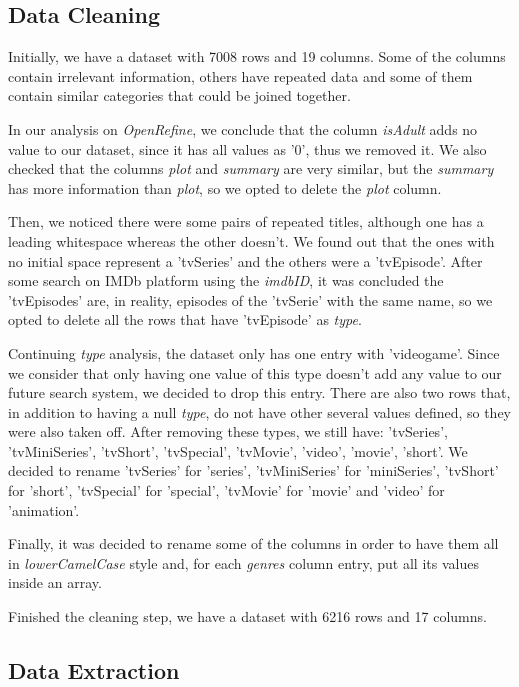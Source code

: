 \documentclass[sigplan,screen]{acmart}
\begin{document}
\subsection{Data Cleaning}

Initially, we have a dataset with 7008 rows and 19 columns. Some of the columns contain irrelevant information, others have repeated data and some of them contain similar categories that could be joined together.

In our analysis on \textit{OpenRefine}, we conclude that the column \textit{isAdult} adds no value to our dataset, since it has all values as '0', thus we removed it. We also checked that the columns \textit{plot} and \textit{summary} are very similar, but the \textit{summary} has more information than \textit{plot}, so we opted to delete the \textit{plot} column.

Then, we noticed there were some pairs of repeated titles, although one has a leading whitespace whereas the other doesn't. We found out that the ones with no initial space represent a 'tvSeries' and the others were a 'tvEpisode'. After some search on IMDb platform using the \textit{imdbID}, it was concluded the 'tvEpisodes' are, in reality, episodes of the 'tvSerie' with the same name, so we opted to delete all the rows that have 'tvEpisode' as \textit{type}.

Continuing \textit{type} analysis, the dataset only has one entry with 'videogame'. Since we consider that only having  one value of this type doesn't add any value to our future search system, we decided to drop this entry. There are also two rows that, in addition to having a null \textit{type}, do not have other several values defined, so they were also taken off. After removing these types, we still have: 'tvSeries', 'tvMiniSeries', 'tvShort', 'tvSpecial', 'tvMovie', 'video', 'movie', 'short'. We decided to rename 'tvSeries' for 'series', 'tvMiniSeries' for 'miniSeries', 'tvShort' for 'short', 'tvSpecial' for 'special', 'tvMovie' for 'movie' and 'video' for 'animation'.

Finally, it was decided to rename some of the columns in order to have them all in \textit{lowerCamelCase} style and, for each \textit{genres} column entry, put all its values inside an array.  

Finished the cleaning step, we have a dataset with 6216 rows and 17 columns.

\subsection{Data Extraction}
\end{document}
